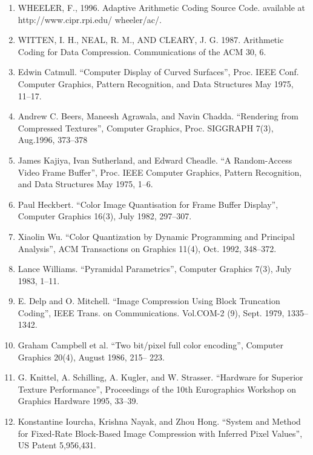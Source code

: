 \documentclass{article}
\begin{document}
\begin{enumerate}
	\item WHEELER, F., 1996. Adaptive Arithmetic Coding Source Code.
	available at http://www.cipr.rpi.edu/ wheeler/ac/.
	
	\item WITTEN, I. H., NEAL, R. M., AND CLEARY, J. G. 1987. Arithmetic Coding for Data Compression. Communications of the	ACM 30, 6.
	
	\item Edwin Catmull. “Computer Display of Curved Surfaces”, Proc. IEEE Conf. Computer Graphics, Pattern Recognition, and Data Structures May 1975, 11–17.

	\item Andrew C. Beers, Maneesh Agrawala, and Navin
	Chadda. “Rendering from Compressed Textures”,
	Computer Graphics, Proc. SIGGRAPH 7(3),
	Aug.1996, 373–378

	\item James Kajiya, Ivan Sutherland, and Edward Cheadle.
	“A Random-Access Video Frame Buffer”, Proc. IEEE
	Computer Graphics, Pattern Recognition, and Data
	Structures May 1975, 1–6.

	\item Paul Heckbert. “Color Image Quantisation for Frame
	Buffer Display”, Computer Graphics 16(3), July 1982,
	297–307.
	
	\item Xiaolin Wu. “Color Quantization by Dynamic Programming and Principal Analysis”, ACM Transactions
	on Graphics 11(4), Oct. 1992, 348–372.
	
	\item Lance Williams. “Pyramidal Parametrics”, Computer
	Graphics 7(3), July 1983, 1–11.
	
	\item E. Delp and O. Mitchell. “Image Compression Using
	Block Truncation Coding”, IEEE Trans. on Communications. Vol.COM-2 (9), Sept. 1979, 1335–1342.

	\item Graham Campbell et al. “Two bit/pixel full color encoding”, Computer Graphics 20(4), August 1986, 215–
	223.

	\item G. Knittel, A. Schilling, A. Kugler, and W. Strasser.
	“Hardware for Superior Texture Performance”, Proceedings of the 10th Eurographics Workshop on Graphics Hardware 1995, 33–39.

	\item Konstantine Iourcha, Krishna Nayak, and Zhou Hong.
	“System and Method for Fixed-Rate Block-Based Image Compression with Inferred Pixel Values”, US
	Patent 5,956,431.


\end{enumerate}
\end{document}

